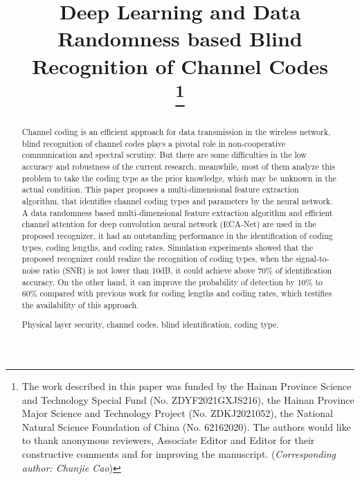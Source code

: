 \documentclass[conference]{IEEEtran}
\begin{document}
\title{Deep Learning and Data Randomness based Blind Recognition of Channel Codes\\

\thanks{The work described in this paper was funded by the Hainan Province Science and Technology Special Fund (No. ZDYF2021GXJS216), the Hainan Province Major Science and Technology Project (No. ZDKJ2021052), the National Natural Science Foundation of China (No. 62162020). The authors would like to thank anonymous reviewers, Associate Editor and Editor for their constructive comments and for improving the manuscript. (\textit{Corresponding author: Chunjie Cao})}}


\author{
}

\maketitle

\begin{abstract}
Channel coding is an efficient approach for data transmission in the wireless network, blind recognition of channel codes plays a pivotal role in non-cooperative communication and spectral scrutiny. But there are some difficulties in the low accuracy and robustness of the current research, meanwhile, most of them analyze this problem to take the coding type as the prior knowledge, which may be unknown in the actual condition. This paper proposes a multi-dimensional feature extraction algorithm, that identifies channel coding types and parameters by the neural network. A data randomness based multi-dimensional feature extraction algorithm and efficient channel attention for deep convolution neural network (ECA-Net) are used in the proposed recognizer, it had an outstanding performance in the identification of coding types, coding lengths, and coding rates. Simulation experiments showed that the proposed recognizer could realize the recognition of coding types, when the signal-to-noise ratio (SNR) is not lower than 10dB, it could achieve above 70\% of identification accuracy. On the other hand, it can improve the probability of detection by 10\% to 60\% compared with previous work for coding lengths and coding rates, which testifies the availability of this approach.


\begin{IEEEkeywords}
	Physical layer security, channel codes, blind identification, coding type.
\end{IEEEkeywords}

\end{abstract}
\end{document}
